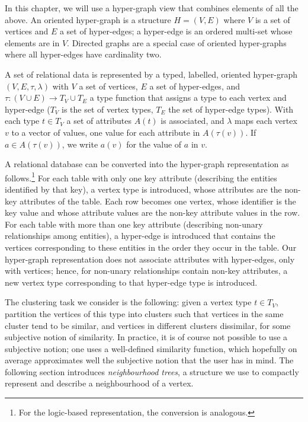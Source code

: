 In this chapter, we will use a hyper-graph view that combines elements of all the above.
An oriented hyper-graph is a structure $H=(V,E)$ where $V$ is a set of vertices and $E$ a set of hyper-edges; a hyper-edge is an ordered multi-set whose elements are in $V$.
Directed graphs are a special case of oriented hyper-graphs where all hyper-edges have cardinality two.


A set of relational data is represented by a typed, labelled, oriented hyper-graph $(V,E,\tau,\lambda)$ with $V$ a set of vertices, $E$ a set of hyper-edges, and $\tau: (V \cup E) \rightarrow T_V \cup T_E$  a type function that assigns a type to each vertex and hyper-edge ($T_V$ is the set of vertex types, $T_E$ the set of hyper-edge types).
With each type $t \in T_V$ a set of attributes $A(t)$ is associated, and $\lambda$ maps each vertex $v$ to a vector of values, one value for each attribute in $A(\tau(v))$.
If $a \in A(\tau(v))$, we write $a(v)$ for the value of $a$ in $v$.


A relational database can be converted into the hyper-graph representation as follows.\footnote{For the logic-based representation, the conversion is analogous.}
For each table with only one key attribute (describing the entities identified by that key), a vertex type is introduced, whose attributes are the non-key attributes of the table.
Each row becomes one vertex, whose identifier is the key value and whose attribute values are the non-key attribute values in the row.
For each table with more than one key attribute (describing non-unary relationships among entities), a hyper-edge is introduced that contains the vertices corresponding to these entities in the order they occur in the table.
Our hyper-graph representation does not associate attributes with hyper-edges, only with vertices; hence, for non-unary relationships contain non-key attributes, a new vertex type corresponding to that hyper-edge type is introduced.


The clustering task we consider is the following: given a vertex type $t \in T_V$, partition the vertices of this type into clusters such that vertices in the same cluster tend to be similar, and vertices in different clusters dissimilar, for some subjective notion of similarity.
In practice, it is of course not possible to use a subjective notion; one uses a well-defined similarity function, which hopefully on average approximates well the subjective notion that the user has in mind.
The following section introduces \textit{neighbourhood trees}, a structure we use to compactly represent and describe a neighbourhood of a vertex.






